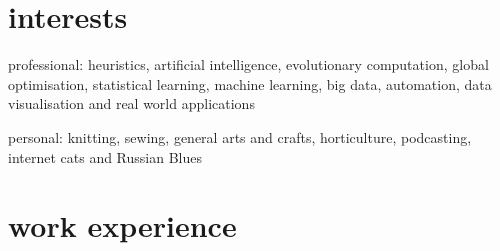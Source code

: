 \documentclass[]{cv} %
\begin{document}
\section{interests}
{\boldfont professional:} heuristics, artificial intelligence, evolutionary 
computation, global optimisation, statistical learning, machine learning, big data, automation, data visualisation and real world applications 

{\boldfont personal:} knitting, sewing, general arts and crafts, horticulture,  podcasting, internet cats and Russian Blues



\newpage
\removeaside


\section{work experience}

\end{document}
